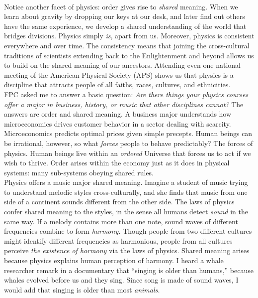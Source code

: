 \documentclass[../../../main.tex]{subfiles}
\begin{document}
\\
\vspace{0.15cm}
Notice another facet of physics: order gives rise to \textit{shared} meaning.  When we learn about gravity by dropping our keys at our desk, and later find out others have the same experience, we develop a shared understanding of the world that bridges divisions.  Physics simply \textit{is}, apart from us.  Moreover, physics is consistent everywhere and over time.  The consistency means that joining the cross-cultural traditions of scientists extending back to the Enlightenment and beyond allows us to build on the shared meaning of our ancestors.  Attending even one national meeting of the American Physical Society (APS) shows us that physics is a discipline that attracts people of all faiths, races, cultures, and ethnicities.
\\
\vspace{0.15cm}
FPC asked me to answer a basic question: \textit{Are there things your physics courses offer a major in business, history, or music that other disciplines cannot?}  The answers are order and shared meaning.  A business major understands how microeconomics drives customer behavior in a sector dealing with scarcity.  Microeconomics predicts optimal prices given simple precepts.  Human beings can be irrational, however, so what \textit{forces} people to behave predictably?  The forces of physics.  Human beings live within an \textit{ordered} Universe that forces us to act if we wish to thrive.  Order arises within the economy just as it does in physical systems: many sub-systems obeying shared rules.
\\
\vspace{0.15cm}
Physics offers a music major shared meaning.  Imagine a student of music trying to understand melodic styles cross-culturally, and she finds that music from one side of a continent sounds different from the other side.  The laws of physics confer shared meaning to the styles, in the sense all humans detect \textit{sound} in the same way.  If a melody contains more than one note, sound waves of different frequencies combine to form \textit{harmony.}  Though people from two different cultures might identify different frequencies as harmonious, people from all cultures perceive \textit{the existence of harmony} via the laws of physics.  Shared meaning arises because physics explains human perception of harmony.  I heard a whale researcher remark in a documentary that ``singing is older than humans,'' because whales evolved before us and they sing.  Since song is made of sound waves, I would add that singing is older than most \textit{animals.}
\end{document}
